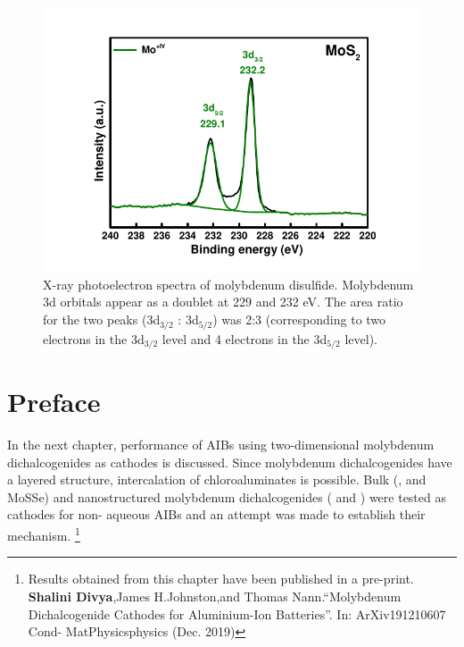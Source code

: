 \begin{figure}[tbh!]
\centering
\includegraphics[width=\textwidth]{Figures/chap2fig/XPS.pdf}
\caption{X-ray photoelectron spectra of molybdenum disulfide. Molybdenum 3d orbitals appear as a doublet at 229 and 232 eV. The area ratio for the two peaks (3d$_{3/2}$ : 3d$_{5/2}$) was 2:3 (corresponding to two electrons in the 3d$_{3/2}$ level and 4 electrons in the 3d$_{5/2}$ level).}
\label{Figures/chap2fig:XPS}
\end{figure}
\newpage
\newpage
\section*{Preface}
In the next chapter, performance of AIBs using two-dimensional molybdenum dichalcogenides as cathodes is discussed. Since molybdenum dichalcogenides have a layered structure, intercalation of chloroaluminates is possible. Bulk (,  and MoSSe) and nanostructured molybdenum dichalcogenides ( and ) were tested as cathodes for non- aqueous AIBs and an attempt was made to establish their mechanism. 
\footnote{Results obtained from this chapter have been published in a pre-print. \textbf{Shalini Divya},James H.Johnston,and Thomas Nann.“Molybdenum Dichalcogenide Cathodes for Aluminium-Ion Batteries”. In: ArXiv191210607 Cond- MatPhysicsphysics (Dec. 2019)} 






